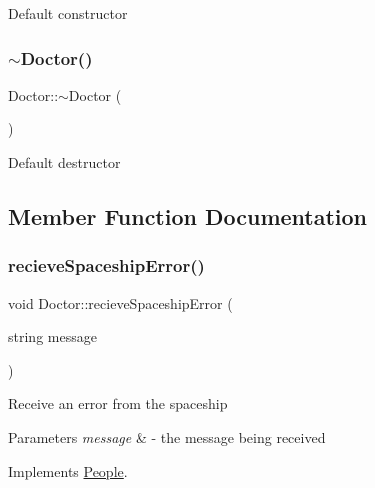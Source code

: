 Default constructor \mbox{\label{classDoctor_a1481ccfafebc7a2424d3659a0223ebfe}} 
\subsubsection{\texorpdfstring{$\sim$\+Doctor()}{~Doctor()}}
{\footnotesize\ttfamily Doctor\+::$\sim$\+Doctor (\begin{DoxyParamCaption}{ }\end{DoxyParamCaption})\hspace{0.3cm}{\ttfamily [inline]}}

Default destructor 

\subsection{Member Function Documentation}
\mbox{\label{classDoctor_a820dca3b9f05d3f69c47bd7318923b88}} 
\subsubsection{\texorpdfstring{recieve\+Spaceship\+Error()}{recieveSpaceshipError()}}
{\footnotesize\ttfamily void Doctor\+::recieve\+Spaceship\+Error (\begin{DoxyParamCaption}\item[{string}]{message }\end{DoxyParamCaption})\hspace{0.3cm}{\ttfamily [virtual]}}

Receive an error from the spaceship 
\begin{DoxyParams}{Parameters}
{\em message} & -\/ the message being received \\
\hline
\end{DoxyParams}


Implements \hyperlink{classPeople_a0685df78be631783138865e03cc7c85d}{People}.

\mbox{\label{classDoctor_a5a524981ce52102f975cf9c569137ce5}} 
